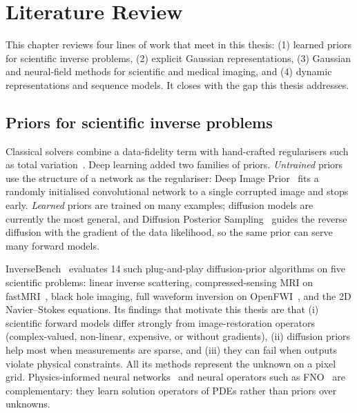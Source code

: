 \chapter{Literature Review}
\label{ch:literature}

This chapter reviews four lines of work that meet in this thesis: (1) learned priors for scientific inverse problems,
(2) explicit Gaussian representations, (3) Gaussian and neural-field methods for scientific and medical imaging, and
(4) dynamic representations and sequence models. It closes with the gap this thesis addresses.

\section{Priors for scientific inverse problems}
Classical solvers combine a data-fidelity term with hand-crafted regularisers such as total
variation~\citep{rudin1992tv}. Deep learning added two families of priors. \emph{Untrained} priors use the structure
of a network as the regulariser: Deep Image Prior~\citep{ulyanov2018dip} fits a randomly initialised convolutional
network to a single corrupted image and stops early. \emph{Learned} priors are trained on many examples; diffusion
models are currently the most general, and Diffusion Posterior Sampling~\citep{chung2023dps} guides the reverse
diffusion with the gradient of the data likelihood, so the same prior can serve many forward models.

InverseBench~\citep{zheng2025inversebench} evaluates 14 such plug-and-play diffusion-prior algorithms on five
scientific problems: linear inverse scattering, compressed-sensing MRI on fastMRI~\citep{zbontar2018fastmri}, black
hole imaging, full waveform inversion on OpenFWI~\citep{deng2022openfwi}, and the 2D Navier--Stokes equations. Its
findings that motivate this thesis are that (i) scientific forward models differ strongly from image-restoration
operators (complex-valued, non-linear, expensive, or without gradients), (ii) diffusion priors help most when
measurements are sparse, and (iii) they can fail when outputs violate physical constraints. All its methods represent
the unknown on a pixel grid. Physics-informed neural networks~\citep{raissi2019pinn} and neural operators such as
FNO~\citep{li2021fno} are complementary: they learn solution operators of PDEs rather than priors over unknowns.

